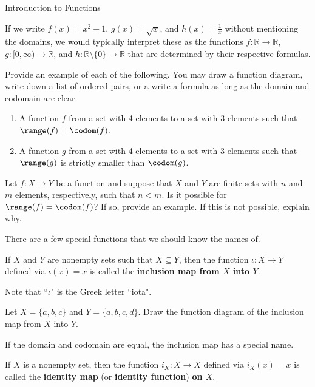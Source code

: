 \begin{section}{Introduction to Functions}
\begin{example}
If we write $f(x)=x^2-1$, $g(x)=\sqrt{x}$, and $h(x)=\frac{1}{x}$ without mentioning the domains, we would typically interpret these as the functions $f:\mathbb{R}\to \mathbb{R}$, $g:[0,\infty)\to \mathbb{R}$, and $h:\mathbb{R}\setminus \{0\}\to \mathbb{R}$ that are determined by their respective formulas.
\end{example}

\begin{problem}
Provide an example of each of the following.  You may draw a function diagram, write down a list of ordered pairs, or a write a formula as long as the domain and codomain are clear.
\begin{enumerate}[label=\textrm{(\alph*)}]
\item A function $f$ from a set with 4 elements to a set with 3 elements such that $\range(f)=\codom(f)$.
\item A function $g$ from a set with 4 elements to a set with 3 elements such that $\range(g)$ is strictly smaller than $\codom(g)$.
\end{enumerate}
\end{problem}

\begin{problem}
Let $f:X\to Y$ be a function and suppose that $X$ and $Y$ are finite sets with $n$ and $m$ elements, respectively, such that $n<m$.  Is it possible for $\range(f)=\codom(f)$?  If so, provide an example.  If this is not possible, explain why.
\end{problem}

There are a few special functions that we should know the names of.

\begin{definition}
If $X$ and $Y$ are nonempty sets such that $X\subseteq Y$, then the function $\iota:X\to Y$ defined via $\iota(x)=x$ is called the \textbf{inclusion map from $X$ into $Y$}.
\end{definition}

Note that ``$\iota$" is the Greek letter ``iota".

\begin{problem}
Let $X=\{a,b,c\}$ and $Y=\{a,b,c,d\}$.  Draw the function diagram of the inclusion map from $X$ into $Y$.
\end{problem}

If the domain and codomain are equal, the inclusion map has a special name.

\begin{definition}
If $X$ is a nonempty set, then the function $i_X:X\to X$ defined via $i_X(x)=x$ is called the \textbf{identity map} (or \textbf{identity function}) \textbf{on $X$}.
\end{definition}


\end{section}
